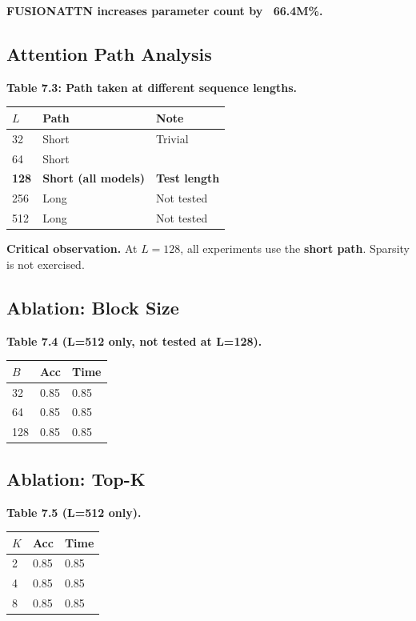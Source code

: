 \textbf{FUSIONATTN increases parameter count by ~66.4M\%.}

\subsection{Attention Path Analysis}

\textbf{Table 7.3: Path taken at different sequence lengths.}

\begin{table}[H]
\centering
\small
\begin{tabular}{lll}
\toprule
\textbf{$L$} & \textbf{Path} & \textbf{Note} \\
\midrule
32 & Short & Trivial \\
64 & Short &  \\
\textbf{128} & \textbf{Short (all models)} & \textbf{Test length} \\
256 & Long & Not tested \\
512 & Long & Not tested \\
\bottomrule
\end{tabular}
\end{table}

\textbf{   Critical observation.} At $L = 128$, all experiments use the 
\textbf{short path}. Sparsity is not exercised.

\subsection{Ablation: Block Size}

\textbf{Table 7.4 (L=512 only, not tested at L=128).}

\begin{table}[H]
\centering
\small
\begin{tabular}{lll}
\toprule
\textbf{$B$} & \textbf{Acc} & \textbf{Time} \\
\midrule
32 & 0.85 & 0.85 \\
64 & 0.85 & 0.85 \\
128 & 0.85 & 0.85 \\
\bottomrule
\end{tabular}
\end{table}

\subsection{Ablation: Top-K}

\textbf{Table 7.5 (L=512 only).}

\begin{table}[H]
\centering
\small
\begin{tabular}{lll}
\toprule
\textbf{$K$} & \textbf{Acc} & \textbf{Time} \\
\midrule
2 & 0.85 & 0.85 \\
4 & 0.85 & 0.85 \\
8 & 0.85 & 0.85 \\
\bottomrule
\end{tabular}
\end{table}

